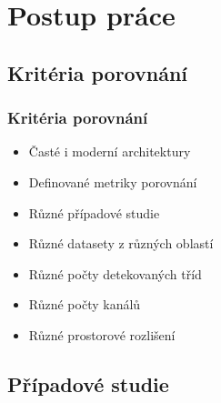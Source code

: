 \documentclass[10pt, t]{beamer}
\begin{document}

\section{Postup práce}


\subsection{Kritéria porovnání}


\begin{frame}

\frametitle{Kritéria porovnání}

\begin{itemize}
	\item Časté i moderní architektury
	\item Definované metriky porovnání
	\item Různé případové studie
	\item<2-> Různé datasety z různých oblastí
	\item<3-> Různé počty detekovaných tříd
	\item<4-> Různé počty kanálů
	\item<5-> Různé prostorové rozlišení
\end{itemize}

\end{frame}


\subsection{Případové studie}

\end{document}
